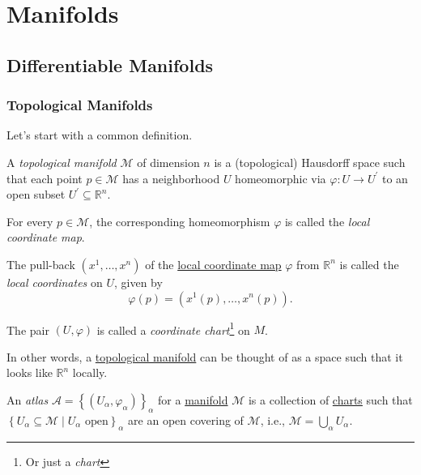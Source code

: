 \chapter{Manifolds}
\section{Differentiable Manifolds}
\subsection{Topological Manifolds}
Let's start with a common definition.

\begin{definition}\label{def:topological-manifold}
	A \emph{topological manifold} \(\mathcal{M} \) of dimension \(n\) is a (topological) Hausdorff space such that each point \(p\in \mathcal{M} \) has a neighborhood \(U\) homeomorphic via \(\varphi\colon U \to U^\prime \) to an open subset \(U^\prime \subseteq \mathbb{R} ^n\).
	\begin{definition}\label{def:local-coordinate-map}
		For every \(p\in \mathcal{M} \), the corresponding homeomorphism \(\varphi \) is called the \emph{local coordinate map}.
	\end{definition}
	\begin{definition}\label{def:local-coordinate}
		The pull-back \((x^1, \ldots , x^n)\) of the \hyperref[def:local-coordinate-map]{local coordinate map} \(\varphi \) from \(\mathbb{R} ^n\) is called the \emph{local coordinates} on \(U\), given by
		\[
			\varphi (p) = (x^1(p), \ldots , x^n(p)).
		\]
	\end{definition}
	\begin{definition}\label{def:coordinate-chart}
		The pair \((U, \varphi )\) is called a \emph{coordinate chart}\footnote{Or just a \emph{chart}} on \(M\).
	\end{definition}
\end{definition}

In other words, a \hyperref[def:topological-manifold]{topological manifold} can be thought of as a space such that it looks like \(\mathbb{R} ^n\) locally.

\begin{center}
\end{center}

\begin{definition}[Atlas]\label{def:atlas}
	An \emph{atlas} \(\mathcal{A} = \left\{ (U_\alpha , \varphi _\alpha) \right\}_\alpha \) for a \hyperref[def:topological-manifold]{manifold} \(\mathcal{M}\) is a collection of \hyperref[def:coordinate-chart]{charts} such that \(\left\{ U_\alpha\subseteq \mathcal{M} \mid U_\alpha \text{ open} \right\} _\alpha \) are an open covering of \(\mathcal{M} \), i.e., \(\mathcal{M} = \bigcup_{\alpha } U_\alpha \).
\end{definition}

